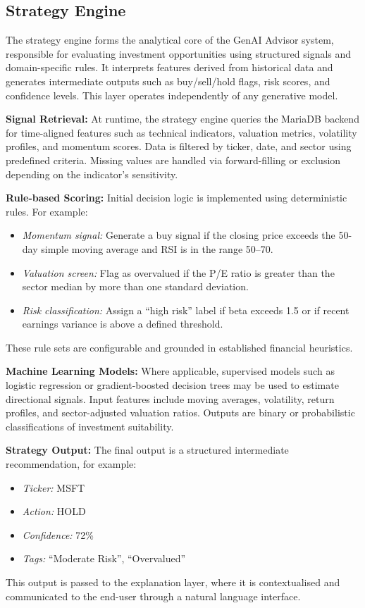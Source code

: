 \subsection{Strategy Engine}

The strategy engine forms the analytical core of the GenAI Advisor system, responsible for evaluating investment opportunities using structured signals and domain-specific rules. It interprets features derived from historical data and generates intermediate outputs such as buy/sell/hold flags, risk scores, and confidence levels. This layer operates independently of any generative model.

\textbf{Signal Retrieval:} At runtime, the strategy engine queries the MariaDB backend for time-aligned features such as technical indicators, valuation metrics, volatility profiles, and momentum scores. Data is filtered by ticker, date, and sector using predefined criteria. Missing values are handled via forward-filling or exclusion depending on the indicator’s sensitivity.

\textbf{Rule-based Scoring:} Initial decision logic is implemented using deterministic rules. For example:
\begin{itemize}
    \item \emph{Momentum signal:} Generate a buy signal if the closing price exceeds the 50-day simple moving average and RSI is in the range 50–70.
    \item \emph{Valuation screen:} Flag as overvalued if the P/E ratio is greater than the sector median by more than one standard deviation.
    \item \emph{Risk classification:} Assign a “high risk” label if beta exceeds 1.5 or if recent earnings variance is above a defined threshold.
\end{itemize}
These rule sets are configurable and grounded in established financial heuristics.

\textbf{Machine Learning Models:} Where applicable, supervised models such as logistic regression or gradient-boosted decision trees may be used to estimate directional signals. Input features include moving averages, volatility, return profiles, and sector-adjusted valuation ratios. Outputs are binary or probabilistic classifications of investment suitability.

\textbf{Strategy Output:} The final output is a structured intermediate recommendation, for example:
\begin{itemize}
    \item \emph{Ticker:} MSFT
    \item \emph{Action:} HOLD
    \item \emph{Confidence:} 72\%
    \item \emph{Tags:} “Moderate Risk”, “Overvalued”
\end{itemize}
This output is passed to the explanation layer, where it is contextualised and communicated to the end-user through a natural language interface.

